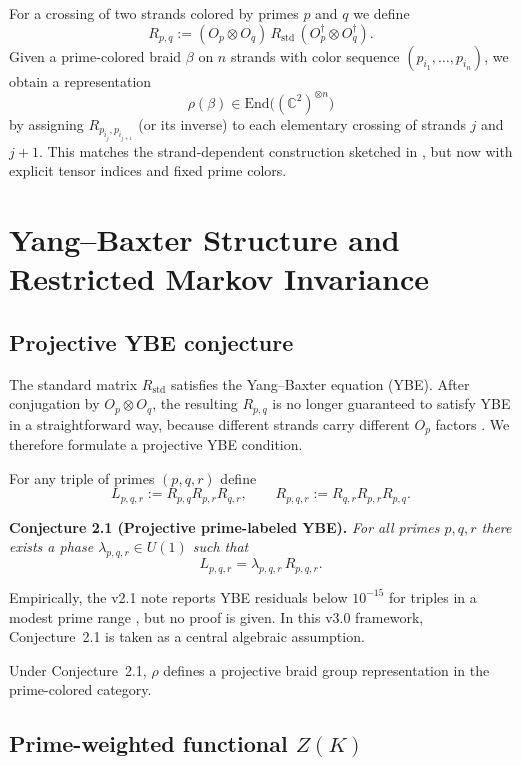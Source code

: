 \documentclass[11pt]{article}
\begin{document}
For a crossing of two strands colored by primes $p$ and $q$ we define
\begin{equation}
  R_{p,q} := (O_p \otimes O_q)\, R_{\mathrm{std}}\, (O_p^\dagger \otimes O_q^\dagger).
  \label{eq:R-pq}
\end{equation}
Given a prime-colored braid $\beta$ on $n$ strands with color sequence $(p_{i_1},\dots,p_{i_n})$, we obtain a representation
\[
  \rho(\beta) \in \mathrm{End}\big((\mathbb{C}^2)^{\otimes n}\big)
\]
by assigning $R_{p_{i_j},p_{i_{j+1}}}$ (or its inverse) to each elementary crossing of strands $j$ and $j+1$. This matches the strand-dependent construction sketched in \cite[Sec.~2.2]{MTv21}, but now with explicit tensor indices and fixed prime colors.

\section{Yang--Baxter Structure and Restricted Markov Invariance}

\subsection{Projective YBE conjecture}

The standard matrix $R_{\mathrm{std}}$ satisfies the Yang--Baxter equation (YBE). After conjugation by $O_p \otimes O_q$, the resulting $R_{p,q}$ is no longer guaranteed to satisfy YBE in a straightforward way, because different strands carry different $O_p$ factors \cite[Sec.~2.3]{MTv21}. We therefore formulate a projective YBE condition.

For any triple of primes $(p,q,r)$ define
\[
  L_{p,q,r} := R_{p,q} R_{p,r} R_{q,r}, \qquad
  R_{p,q,r} := R_{q,r} R_{p,r} R_{p,q}.
\]

\medskip

\noindent\textbf{Conjecture 2.1 (Projective prime-labeled YBE).}
\emph{For all primes $p,q,r$ there exists a phase $\lambda_{p,q,r} \in U(1)$ such that}
\[
  L_{p,q,r} = \lambda_{p,q,r}\, R_{p,q,r}.
\]

Empirically, the v2.1 note reports YBE residuals below $10^{-15}$ for triples in a modest prime range \cite[Sec.~2.3, Remark~2.1]{MTv21}, but no proof is given. In this v3.0 framework, Conjecture~2.1 is taken as a central algebraic assumption.

Under Conjecture~2.1, $\rho$ defines a projective braid group representation in the prime-colored category.

\subsection{Prime-weighted functional $Z(K)$}
\end{document}
